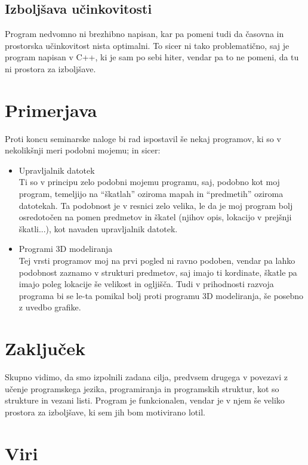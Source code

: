 \documentclass[12pt, a4paper, notitlepage]{article}
\begin{document}
  \subsection{Izboljšava učinkovitosti}
  Program nedvomno ni brezhibno napisan, kar pa pomeni tudi da časovna in prostorska učinkovitost nista optimalni. To sicer ni tako problematično, saj je program napisan v C++, ki je sam po sebi hiter, vendar pa to ne pomeni, da tu ni prostora za izboljšave.
  \section{Primerjava}
  Proti koncu seminarske naloge bi rad ispostavil še nekaj programov, ki so v nekolikšnji meri podobni mojemu; in sicer:
  \begin{itemize}
    \item Upravljalnik datotek\\ Ti so v principu zelo podobni mojemu programu, saj, podobno kot moj program, temeljijo na ``škatlah'' oziroma mapah in ``predmetih'' oziroma datotekah. Ta podobnost je v resnici zelo velika, le da je moj program bolj osredotočen na pomen predmetov in škatel (njihov opis, lokacijo v prejšnji škatli...), kot navaden upravljalnik datotek.
    \item Programi 3D modeliranja\\ Tej vrsti programov moj na prvi pogled ni ravno podoben, vendar pa lahko podobnost zaznamo v strukturi predmetov, saj imajo ti kordinate, škatle pa imajo poleg lokacije še velikost in ogljišča. Tudi v prihodnosti razvoja programa bi se le-ta pomikal bolj proti programu 3D modeliranja, še posebno z uvedbo grafike.
  \end{itemize}
  \section{Zaključek}
  Skupno vidimo, da smo izpolnili zadana cilja, predvsem drugega v povezavi z učenje programskega jezika, programiranja in programskih struktur, kot so strukture in vezani listi. Program je funkcionalen, vendar je v njem še veliko prostora za izboljšave, ki sem jih bom motivirano lotil.
  \newpage
  \section{Viri}
  \printbibliography[heading=none]
\end{document}
